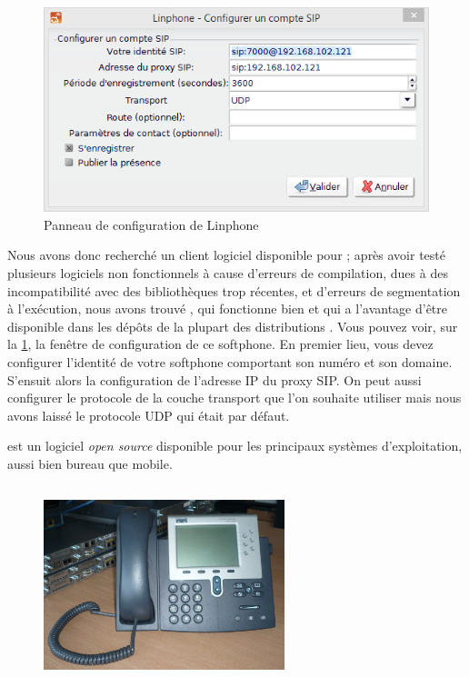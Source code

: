 \subsection{\lnp}

\begin{figure}[h]
\begin{center}
\includegraphics[width=12cm]{images/config-linphone.png}
\end{center}
\caption{Panneau de configuration de Linphone}
\label{conflinphone}
\end{figure}

Nous avons donc recherché un client logiciel disponible pour {\lnx} ; après avoir testé plusieurs logiciels non fonctionnels à cause d’erreurs de compilation, dues à des incompatibilité avec des bibliothèques trop récentes, et d’erreurs de segmentation à l’exécution, nous avons trouvé {\lnp}, qui fonctionne bien et qui a l’avantage d’être disponible dans les dépôts de la plupart des distributions {\lnx}.
Vous pouvez voir, sur la \cref{conflinphone}, la fenêtre de configuration de ce softphone. En premier lieu, vous devez configurer l'identité de votre softphone comportant son numéro et son domaine. S'ensuit alors la configuration de l'adresse IP du proxy SIP. On peut aussi configurer le protocole de la couche transport que l'on souhaite utiliser mais nous avons laissé le protocole UDP qui était par défaut.  

{\lnp} est un logiciel \textit{open source} disponible pour les principaux systèmes d’exploitation, aussi bien bureau que mobile.

\subsection{\cph}

\begin{figure}[h]
\begin{center}
\includegraphics[width=7cm]{images/7961.jpg}
\end{center}
\caption{\cph}
\end{figure}

